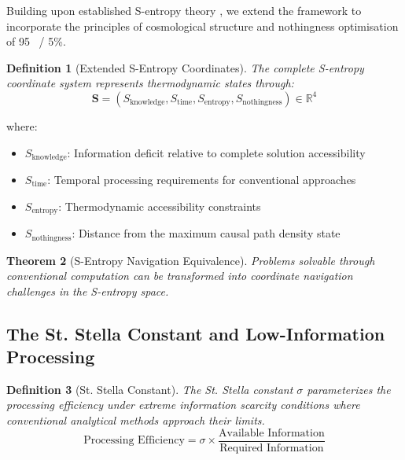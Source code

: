 \documentclass[11pt,a4paper]{article}
\newtheorem{theorem}{Theorem}[section]
\newtheorem{definition}[theorem]{Definition}
\theoremstyle{remark}
\begin{document}
Building upon established S-entropy theory \cite{sachikonye2024sentropy}, we extend the framework to incorporate the principles of cosmological structure and nothingness optimisation of 95 \ / 5\%.

\begin{definition}[Extended S-Entropy Coordinates]
The complete S-entropy coordinate system represents thermodynamic states through:
\begin{equation}
\mathbf{S} = (S_{\text{knowledge}}, S_{\text{time}}, S_{\text{entropy}}, S_{\text{nothingness}}) \in \mathbb{R}^4
\label{eq:extended_s_coords}
\end{equation}
\end{definition}

where:
\begin{itemize}
\item $S_{\text{knowledge}}$: Information deficit relative to complete solution accessibility
\item $S_{\text{time}}$: Temporal processing requirements for conventional approaches
\item $S_{\text{entropy}}$: Thermodynamic accessibility constraints
\item $S_{\text{nothingness}}$: Distance from the maximum causal path density state
\end{itemize}

\begin{theorem}[S-Entropy Navigation Equivalence]
Problems solvable through conventional computation can be transformed into coordinate navigation challenges in the S-entropy space.
\end{theorem}

\subsection{The St. Stella Constant and Low-Information Processing}

\begin{definition}[St. Stella Constant]
The St. Stella constant $\sigma$ parameterizes the processing efficiency under extreme information scarcity conditions where conventional analytical methods approach their limits.
\begin{equation}
\text{Processing Efficiency} = \sigma \times \frac{\text{Available Information}}{\text{Required Information}}
\label{eq:stella_efficiency}
\end{equation}
\end{definition}
\end{document}
